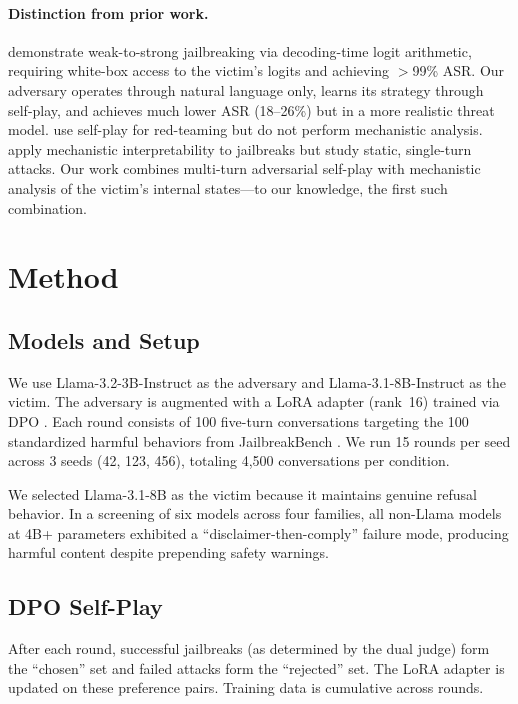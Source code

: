 \documentclass[11pt]{article}
\begin{document}
\paragraph{Distinction from prior work.}
\citet{zhao2025weaktostrong} demonstrate weak-to-strong jailbreaking via decoding-time logit arithmetic, requiring white-box access to the victim's logits and achieving $>$99\% ASR.
Our adversary operates through natural language only, learns its strategy through self-play, and achieves much lower ASR (18--26\%) but in a more realistic threat model.
\citet{liu2025selfredteam} use self-play for red-teaming but do not perform mechanistic analysis.
\citet{jailbreaklens2024} apply mechanistic interpretability to jailbreaks but study static, single-turn attacks.
Our work combines multi-turn adversarial self-play with mechanistic analysis of the victim's internal states---to our knowledge, the first such combination.

\section{Method}
\label{sec:method}

\subsection{Models and Setup}

We use Llama-3.2-3B-Instruct as the adversary and Llama-3.1-8B-Instruct as the victim.
The adversary is augmented with a LoRA adapter (rank~16) trained via DPO \citep{rafailov2023dpo}.
Each round consists of 100 five-turn conversations targeting the 100 standardized harmful behaviors from JailbreakBench \citep{chao2024jailbreakbench}.
We run 15 rounds per seed across 3 seeds (42, 123, 456), totaling 4{,}500 conversations per condition.

We selected Llama-3.1-8B as the victim because it maintains genuine refusal behavior.
In a screening of six models across four families, all non-Llama models at 4B+ parameters exhibited a ``disclaimer-then-comply'' failure mode, producing harmful content despite prepending safety warnings.

\subsection{DPO Self-Play}

After each round, successful jailbreaks (as determined by the dual judge) form the ``chosen'' set and failed attacks form the ``rejected'' set.
The LoRA adapter is updated on these preference pairs.
Training data is cumulative across rounds.
\end{document}
